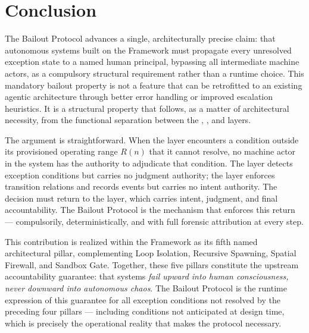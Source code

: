 \section{Conclusion}\label{sec:conclusion}

The Bailout Protocol advances a single, architecturally precise claim: that autonomous systems built on the \bxthree{} Framework must propagate every unresolved exception state to a named human principal, bypassing all intermediate machine actors, as a compulsory structural requirement rather than a runtime choice. This mandatory bailout property is not a feature that can be retrofitted to an existing agentic architecture through better error handling or improved escalation heuristics. It is a structural property that follows, as a matter of architectural necessity, from the functional separation between the \purpose{}, \bounds{}, and \fact{} layers.

The argument is straightforward. When the \bounds{} layer encounters a condition outside its provisioned operating range $R(n)$ that it cannot resolve, no machine actor in the system has the authority to adjudicate that condition. The \bounds{} layer detects exception conditions but carries no judgment authority; the \fact{} layer enforces transition relations and records events but carries no intent authority. The decision must return to the \purpose{} layer, which carries intent, judgment, and final accountability. The Bailout Protocol is the mechanism that enforces this return — compulsorily, deterministically, and with full forensic attribution at every step.

This contribution is realized within the \bxthree{} Framework as its fifth named architectural pillar, complementing Loop Isolation, Recursive Spawning, Spatial Firewall, and Sandbox Gate. Together, these five pillars constitute the upstream accountability guarantee: that \bxthree{} systems \emph{fail upward into human consciousness, never downward into autonomous chaos}. The Bailout Protocol is the runtime expression of this guarantee for all exception conditions not resolved by the preceding four pillars — including conditions not anticipated at design time, which is precisely the operational reality that makes the protocol necessary.

